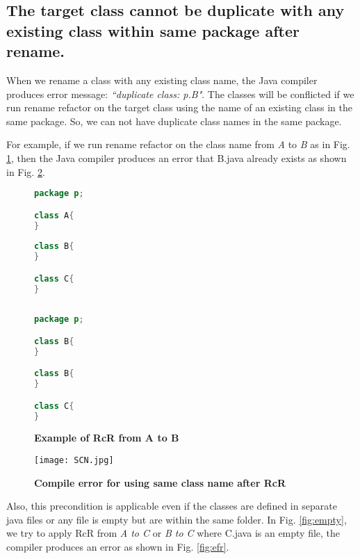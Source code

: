\subsection{The target class cannot be duplicate with any existing class within same package after rename.}

When we rename a class with any existing class name, the Java compiler produces error message: \textit{``duplicate class: p.B"}. The classes will be conflicted if we run rename refactor on the target class using the name of an existing class in the same package. So, we can not have duplicate class names in the same package. 

For example, if we run rename refactor on the class name from \textsl{A} to \textsl{B} as in Fig. \ref{fig:afterrr}, then the Java compiler produces an error that B.java already exists as shown in Fig. \ref{fig:renameclassname}.

\begin{figure}[th]
\centering
\begin{minipage}[t]{0.45\linewidth}
\begin{lstlisting}[language=java, basicstyle=\scriptsize\ttfamily,frame=single]
package p;

class A{
}
	
class B{
}

class C{
}
 
\end{lstlisting}
\end{minipage}
\hfill
\begin{minipage}[t]{0.45\linewidth}
\begin{lstlisting}[language=java, basicstyle=\scriptsize\ttfamily,frame=single]
package p;

class B{
}	

class B{
}

class C{
}

\end{lstlisting}
\end{minipage}
\caption{\textbf{Example of RcR from A to B}}
\label{fig:afterrr}
\end{figure}

\begin{figure}[H]
\centerline{\texttt{[image: SCN.jpg]}}
\caption{\textbf{Compile error for using same class name after RcR}}
\label{fig:renameclassname}
\end{figure}

Also, this precondition is applicable even if the classes are defined in separate java files or any file is empty but are within the same folder. In Fig. \ref{fig:empty}, we try to apply RcR from \emph{A to C} or \emph{B to C} where C.java is an empty file, the compiler produces an error as shown in Fig. \ref{fig:efr}. 

